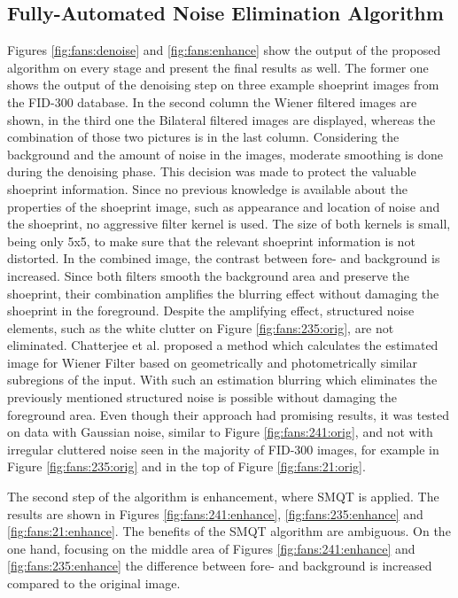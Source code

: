 \documentclass[draft,final]{vutinfth} %
\begin{document}
\subsection{Fully-Automated Noise Elimination Algorithm}
\par
Figures \ref{fig:fans:denoise} and \ref{fig:fans:enhance} show the output of the proposed algorithm on every stage and present the final results as well.
The former one shows the output of the denoising step on three example shoeprint images from the FID-300 database.
In the second column the Wiener filtered images are shown, in the third one the Bilateral filtered images are displayed, whereas the combination of those two pictures is in the last column.
Considering the background and the amount of noise in the images, moderate smoothing is done during the denoising phase.
This decision was made to protect the valuable shoeprint information.
Since no previous knowledge is available about the properties of the shoeprint image, such as appearance and location of noise and the shoeprint, no aggressive filter kernel is used.
The  size of both kernels is small, being only 5x5, to make sure that the relevant shoeprint information is not distorted.
In the combined image, the contrast between fore- and background is increased.
Since both filters smooth the background area and preserve the shoeprint, their combination amplifies the blurring effect without damaging the shoeprint in the foreground. 
Despite the amplifying effect, structured noise elements, such as the white clutter on Figure \ref{fig:fans:235:orig}, are not eliminated.  
Chatterjee et al. \cite{chatterjee2011patch} proposed a method which calculates the estimated image for Wiener Filter based on geometrically and photometrically similar subregions of the input.
With such an estimation blurring which eliminates the previously mentioned structured noise is possible without damaging the foreground area.
Even though their approach had promising results, it was tested on data with Gaussian noise, similar to Figure \ref{fig:fans:241:orig}, and not with irregular cluttered noise seen in the majority of FID-300 images, for example in Figure \ref{fig:fans:235:orig} and in the top of Figure \ref{fig:fans:21:orig}.
\par
The second step of the algorithm is enhancement, where SMQT is applied.
The results are shown in Figures \ref{fig:fans:241:enhance}, \ref{fig:fans:235:enhance} and \ref{fig:fans:21:enhance}.
The benefits of the SMQT algorithm are ambiguous.
On the one hand, focusing on the middle area of Figures  \ref{fig:fans:241:enhance} and \ref{fig:fans:235:enhance} the difference between fore- and background is increased compared to the original image.
\end{document}
